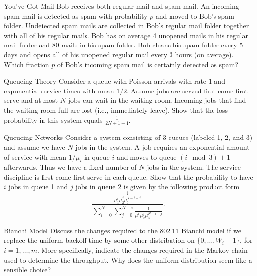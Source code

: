 \begin{problem}{You've Got Mail}
Bob receives both regular mail and spam mail. An incoming
spam mail is detected as spam with probability $p$ and moved to Bob’s spam folder.
Undetected spam mails are collected in Bob’s regular mail folder together with all of his
regular mails. Bob has on average 4 unopened mails in his regular mail folder and 80
mails in his spam folder. Bob cleans his spam folder every 5 days and opens all of his
unopened regular mail every 3 hours (on average). Which fraction $p$ of Bob’s incoming
spam mail is certainly detected as spam?
\end{problem}

\begin{problem}{Queueing Theory}
Consider a queue with Poisson arrivals with rate $1$ and exponential
service times with mean $1/2$. Assume jobs are served first-come-first-serve and at most
$N$ jobs can wait in the waiting room. Incoming jobs that find the waiting room full
are lost (i.e., immediately leave). Show that the loss probability in this system equals
$\frac{1}{2N + 1 - 1}$.
\end{problem}

\begin{problem}{Queueing Networks}
Consider a system consisting of 3 queues (labeled 1, 2, and 3)
and assume we have $N$ jobs in the system. A job requires an exponential amount of
service with mean $1/\mu_i$ in queue $i$ and moves to queue $(i \mod 3) + 1$ afterwards. Thus
we have a fixed number of $N$ jobs in the system. The service discipline is first-come-first-serve in each queue. Show that the probability to have $i$ jobs in queue 1 and $j$ jobs
in queue 2 is given by the following product form
\[
\frac{\frac{1}{\mu_1^i \mu_2^j \mu_3^{N-i-j}}}{\sum_{i=0}^{N} \sum_{j=0}^{N-i} \frac{1}{\mu_1^i \mu_2^j \mu_3^{N-i-j}}}.
\]
\end{problem}

\begin{problem}{Bianchi Model}
Discuss the changes required to the 802.11 Bianchi model if we replace
the uniform backoff time by some other distribution on $\{0, \ldots, W_i -1\}$, for $i = 1, \ldots, m$.
More specifically, indicate the changes required in the Markov chain used to determine
the throughput. Why does the uniform distribution seem like a sensible choice?
\end{problem}

